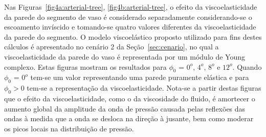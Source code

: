 \documentclass[a4paper,12pt]{monografia}
\theoremstyle{plain}
\theoremstyle{definition}
\theoremstyle{remark}
\begin{document}
Nas Figuras~\ref{fig4a:arterial-tree}, \ref{fig4b:arterial-tree}, o efeito da viscoelasticidade da parede do segmento de vaso é considerado separadamente considerando-se o escoamento invíscido e tomando-se quatro valores diferentes da viscoelasticidade da parede do segmento. O modelo viscoelástico proposto utilizado para fins destes cálculos é apresentado no cenário 2 da Seção~\ref{sec:cenario}, no qual a viscoelasticidade da parede do vaso é representada por um módulo de Young complexo. Estas figuras mostram os resultados para $\phi_0$ = $0^o$, $4^o$, $8^o$ e $12^o$. Quando $\phi_0$ = $0^o$ tem-se um valor representando uma parede puramente elástica e para $\phi_0> 0$ tem-se a representação da viscoelasticidade. Nota-se a partir destas figuras que o efeito da viscoelasticidade, como o da viscosidade do fluido, é amortecer o aumento global da amplitude da onda de pressão causada pelas reflexões das ondas à medida que a onda se desloca na direção à jusante, bem como moderar os picos locais na distribuição de pressão. 
\end{document}
